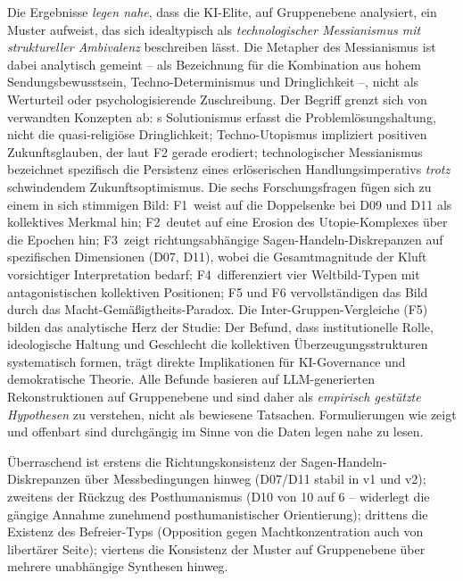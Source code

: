 \documentclass[12pt,a4paper]{article}
\begin{document}
Die Ergebnisse \emph{legen nahe}, dass die KI-Elite, auf Gruppenebene analysiert, ein Muster aufweist, das sich idealtypisch als \emph{technologischer Messianismus mit struktureller Ambivalenz} beschreiben l\"asst. Die Metapher des \glqq Messianismus\grqq{} ist dabei analytisch gemeint -- als Bezeichnung f\"ur die Kombination aus hohem Sendungsbewusstsein, Techno-Determinismus und Dringlichkeit --, nicht als Werturteil oder psychologisierende Zuschreibung. Der Begriff grenzt sich von verwandten Konzepten ab: \citeauthor{Morozov2013}s \glqq Solutionismus\grqq{} erfasst die Probleml\"osungshaltung, nicht die quasi-religi\"ose Dringlichkeit; \glqq Techno-Utopismus\grqq{} impliziert positiven Zukunftsglauben, der laut F2 gerade erodiert; \glqq technologischer Messianismus\grqq{} bezeichnet spezifisch die Persistenz eines erl\"oserischen Handlungsimperativs \emph{trotz} schwindendem Zukunftsoptimismus. Die sechs Forschungsfragen f\"ugen sich zu einem in sich stimmigen Bild: F1~weist auf die \glqq Doppelsenke\grqq{} bei D09 und D11 als kollektives Merkmal hin; F2~deutet auf eine Erosion des Utopie-Komplexes \"uber die Epochen hin; F3~zeigt richtungsabh\"angige Sagen-Handeln-Diskrepanzen auf spezifischen Dimensionen (D07, D11), wobei die Gesamtmagnitude der Kluft vorsichtiger Interpretation bedarf; F4~differenziert vier Weltbild-Typen mit antagonistischen kollektiven Positionen; F5 und F6 vervollst\"andigen das Bild durch das Macht-Gem\"a\ss{}igtheits-Paradox. Die Inter-Gruppen-Vergleiche (F5) bilden das analytische Herz der Studie: Der Befund, dass institutionelle Rolle, ideologische Haltung und Geschlecht die kollektiven \"Uberzeugungsstrukturen systematisch formen, tr\"agt direkte Implikationen f\"ur KI-Governance und demokratische Theorie. Alle Befunde basieren auf LLM-generierten Rekonstruktionen auf Gruppenebene und sind daher als \emph{empirisch gest\"utzte Hypothesen} zu verstehen, nicht als bewiesene Tatsachen. Formulierungen wie \glqq zeigt\grqq{} und \glqq offenbart\grqq{} sind durchg\"angig im Sinne von \glqq die Daten legen nahe\grqq{} zu lesen.

\"Uberraschend ist erstens die Richtungskonsistenz der Sagen-Handeln-Diskrepanzen \"uber Messbedingungen hinweg (D07/D11 stabil in v1 und v2); zweitens der R\"uckzug des Posthumanismus (D10 von 10 auf 6 -- widerlegt die g\"angige Annahme zunehmend posthumanistischer Orientierung); drittens die Existenz des Befreier-Typs (Opposition gegen Machtkonzentration auch von libert\"arer Seite); viertens die Konsistenz der Muster auf Gruppenebene \"uber mehrere unabh\"angige Synthesen hinweg.
\end{document}
